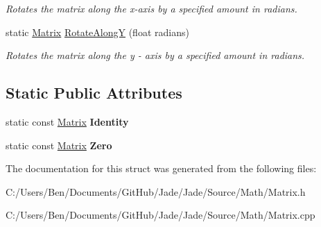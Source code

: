 \begin{DoxyCompactItemize}
\begin{DoxyCompactList}\small\item\em Rotates the matrix along the x-\/axis by a specified amount in radians. \end{DoxyCompactList}\item 
\hypertarget{struct_jade_1_1_math_1_1_matrix_a9293592908c57a2a4ffa3a725303cf4c}{}static \hyperlink{struct_jade_1_1_math_1_1_matrix}{Matrix} \hyperlink{struct_jade_1_1_math_1_1_matrix_a9293592908c57a2a4ffa3a725303cf4c}{Rotate\+Along\+Y} (float radians)\label{struct_jade_1_1_math_1_1_matrix_a9293592908c57a2a4ffa3a725303cf4c}

\begin{DoxyCompactList}\small\item\em Rotates the matrix along the y -\/ axis by a specified amount in radians. \end{DoxyCompactList}\end{DoxyCompactItemize}
\subsection*{Static Public Attributes}
\begin{DoxyCompactItemize}
\item 
\hypertarget{struct_jade_1_1_math_1_1_matrix_a89bfcd378ee8aeba30f393a9bc431e49}{}static const \hyperlink{struct_jade_1_1_math_1_1_matrix}{Matrix} {\bfseries Identity}\label{struct_jade_1_1_math_1_1_matrix_a89bfcd378ee8aeba30f393a9bc431e49}

\item 
\hypertarget{struct_jade_1_1_math_1_1_matrix_a32ed6952707144091d2bee00c0af4cc4}{}static const \hyperlink{struct_jade_1_1_math_1_1_matrix}{Matrix} {\bfseries Zero}\label{struct_jade_1_1_math_1_1_matrix_a32ed6952707144091d2bee00c0af4cc4}

\end{DoxyCompactItemize}


The documentation for this struct was generated from the following files\+:\begin{DoxyCompactItemize}
\item 
C\+:/\+Users/\+Ben/\+Documents/\+Git\+Hub/\+Jade/\+Jade/\+Source/\+Math/Matrix.\+h\item 
C\+:/\+Users/\+Ben/\+Documents/\+Git\+Hub/\+Jade/\+Jade/\+Source/\+Math/Matrix.\+cpp\end{DoxyCompactItemize}
